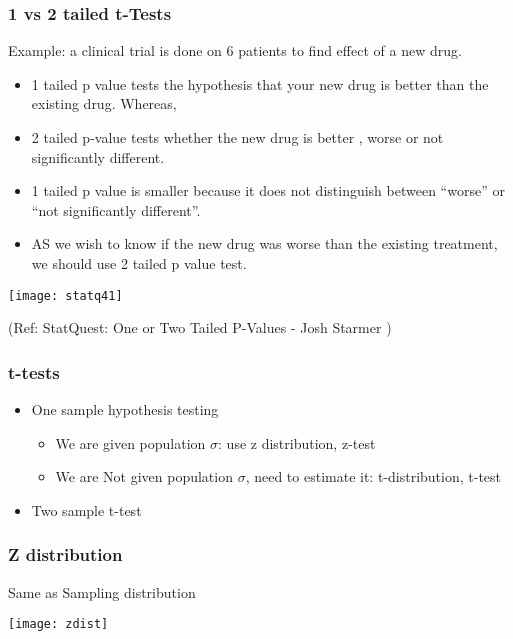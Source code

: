\begin{frame}[fragile]\frametitle{1 vs 2 tailed t-Tests}
Example: a clinical trial is done on 6 patients to find effect of a new drug.


	\begin{itemize}
	\item 1 tailed p value tests the hypothesis that your new drug is better than the existing drug. Whereas,
	\item 2 tailed p-value tests whether the new drug is better , worse or not significantly different.
	\item 1 tailed p value is smaller because it does not distinguish between ``worse'' or ``not significantly different''.
	\item AS we wish to know if the new drug was worse than the existing treatment, we should use 2 tailed p value test.
	\end{itemize}

      \begin{center}
      \texttt{[image: statq41]}
	  	\end{center}

\tiny{(Ref: StatQuest: One or Two Tailed P-Values - Josh Starmer )}
\end{frame}


\begin{frame}[fragile]\frametitle{t-tests}
\begin{itemize}
\item One sample hypothesis testing
\begin{itemize}
\item We are given population $\sigma$: use z distribution, z-test
\item We are Not given population $\sigma$, need to estimate it: t-distribution, t-test
\end{itemize}
\item Two sample t-test 
\end{itemize}
\end{frame}

\begin{frame}
\frametitle{Z distribution}
Same as Sampling distribution
\begin{center}
\texttt{[image: zdist]}
\end{center}
\end{frame}

